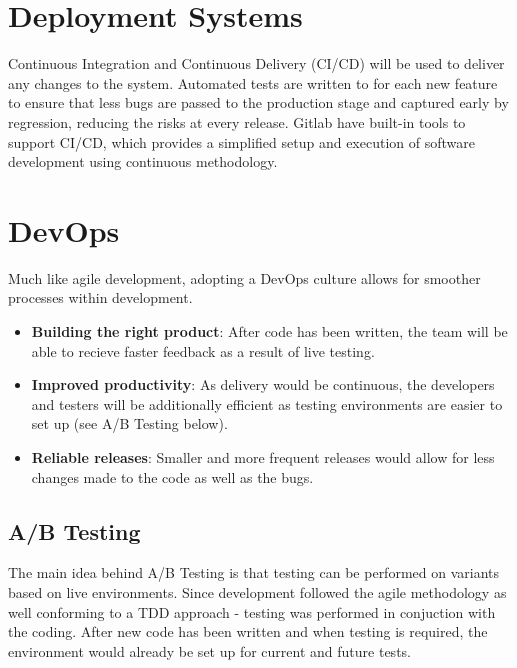 \documentclass[12pt]{article}
\begin{document}
\section{Deployment Systems}
Continuous Integration and Continuous Delivery (CI/CD) will be used to deliver any changes to the system. Automated tests are written to for each new feature to ensure that less bugs are passed to the production stage and captured early by regression, reducing the risks at every release. Gitlab have built-in tools to support CI/CD, which provides a simplified setup and execution of software development using continuous methodology.

\section{DevOps}
Much like agile development, adopting a DevOps culture allows for smoother processes within development.
\begin{itemize}
    \item \textbf{Building the right product}: After code has been written, the team will be able to recieve faster feedback as a result of live testing.
    \item \textbf{Improved productivity}: As delivery would be continuous, the developers and testers will be additionally efficient as testing environments are easier to set up (see A/B Testing below).
    \item \textbf{Reliable releases}: Smaller and more frequent releases would allow for less changes made to the code as well as the bugs.
\end{itemize}

\subsection{A/B Testing}
The main idea behind A/B Testing is that testing can be performed on variants based on live environments. Since development followed the agile methodology as well conforming to a TDD approach - testing was performed in conjuction with the coding. After new code has been written and when testing is required, the environment would already be set up for current and future tests.
\end{document}
